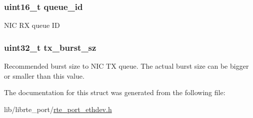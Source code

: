 \subsubsection[{queue\+\_\+id}]{\setlength{\rightskip}{0pt plus 5cm}uint16\+\_\+t queue\+\_\+id}\label{structrte__port__ethdev__writer__params_ad36dd41501a26e3cc7590d1d9a62cdb9}
N\+I\+C R\+X queue I\+D \hypertarget{structrte__port__ethdev__writer__params_a9ed7dbe6241b97c9b68a9491e77c84d0}{}
\subsubsection[{tx\+\_\+burst\+\_\+sz}]{\setlength{\rightskip}{0pt plus 5cm}uint32\+\_\+t tx\+\_\+burst\+\_\+sz}\label{structrte__port__ethdev__writer__params_a9ed7dbe6241b97c9b68a9491e77c84d0}
Recommended burst size to N\+I\+C T\+X queue. The actual burst size can be bigger or smaller than this value. 

The documentation for this struct was generated from the following file\+:\begin{DoxyCompactItemize}
\item 
lib/librte\+\_\+port/\hyperlink{rte__port__ethdev_8h}{rte\+\_\+port\+\_\+ethdev.\+h}\end{DoxyCompactItemize}
